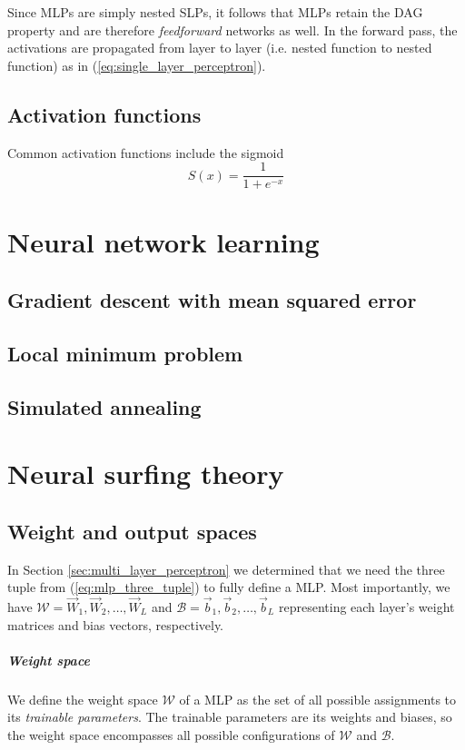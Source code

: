 Since MLPs are simply nested SLPs, it follows that MLPs retain the DAG property and are therefore \textit{feedforward} networks as well.
In the forward pass, the activations are propagated from layer to layer (i.e. nested function to nested function) as in (\ref{eq:single_layer_perceptron}).

\section{Activation functions}
\label{sec:activation_functions}
Common activation functions include the sigmoid
\begin{equation}
    S(x) = \frac{1}{1 + e^{-x}}
\end{equation}
\todo

\chapter{Neural network learning}
\section{Gradient descent with mean squared error}
\section{Local minimum problem}
\section{Simulated annealing}

\chapter{Neural surfing theory}
\section{Weight and output spaces}
In Section \ref{sec:multi_layer_perceptron} we determined that we need the three tuple from (\ref{eq:mlp_three_tuple}) to fully define a MLP. 
Most importantly, we have $\mathscr{W} = \vec{W}_1, \vec{W}_2, \dots, \vec{W}_L$ and $\mathscr{B} = \vec{b}_1, \vec{b}_2, \dots, \vec{b}_L$ representing each layer's weight matrices and bias vectors, respectively. 

\paragraph{Weight space}
We define the weight space $\mathcal{W}$ of a MLP as the set of all possible assignments to its \textit{trainable parameters}. 
The trainable parameters are its weights and biases, so the weight space encompasses all possible configurations of $\mathscr{W}$ and $\mathscr{B}$. 

